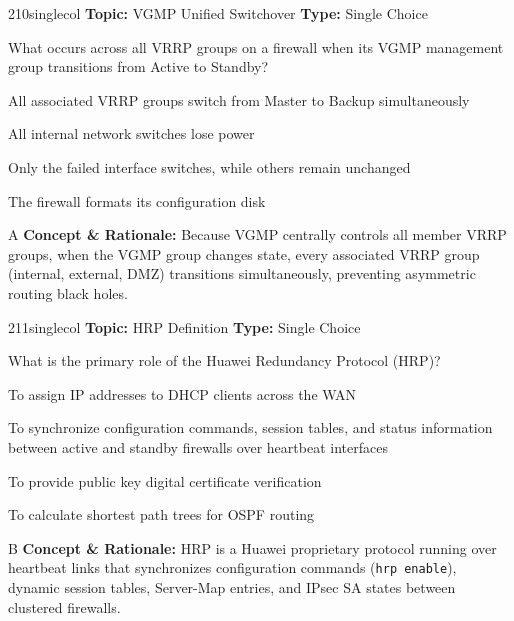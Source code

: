 \begin{qcard}{210}{singlecol}
\textcolor{darkslate!75}{\small\textbf{Topic:} VGMP Unified Switchover \hfill \textbf{Type:} Single Choice}\vspace{0.4em}\par
What occurs across all VRRP groups on a firewall when its VGMP management group transitions from Active to Standby?
\begin{qoptions}
\item All associated VRRP groups switch from Master to Backup simultaneously
\item All internal network switches lose power
\item Only the failed interface switches, while others remain unchanged
\item The firewall formats its configuration disk
\end{qoptions}
\end{qcard}
\nopagebreak
\begin{explainbox}{A}
\textbf{Concept \& Rationale:} Because VGMP centrally controls all member VRRP groups, when the VGMP group changes state, every associated VRRP group (internal, external, DMZ) transitions simultaneously, preventing asymmetric routing black holes.
\end{explainbox}

\begin{qcard}{211}{singlecol}
\textcolor{darkslate!75}{\small\textbf{Topic:} HRP Definition \hfill \textbf{Type:} Single Choice}\vspace{0.4em}\par
What is the primary role of the Huawei Redundancy Protocol (HRP)?
\begin{qoptions}
\item To assign IP addresses to DHCP clients across the WAN
\item To synchronize configuration commands, session tables, and status information between active and standby firewalls over heartbeat interfaces
\item To provide public key digital certificate verification
\item To calculate shortest path trees for OSPF routing
\end{qoptions}
\end{qcard}
\nopagebreak
\begin{explainbox}{B}
\textbf{Concept \& Rationale:} HRP is a Huawei proprietary protocol running over heartbeat links that synchronizes configuration commands (\texttt{hrp enable}), dynamic session tables, Server-Map entries, and IPsec SA states between clustered firewalls.
\end{explainbox}


